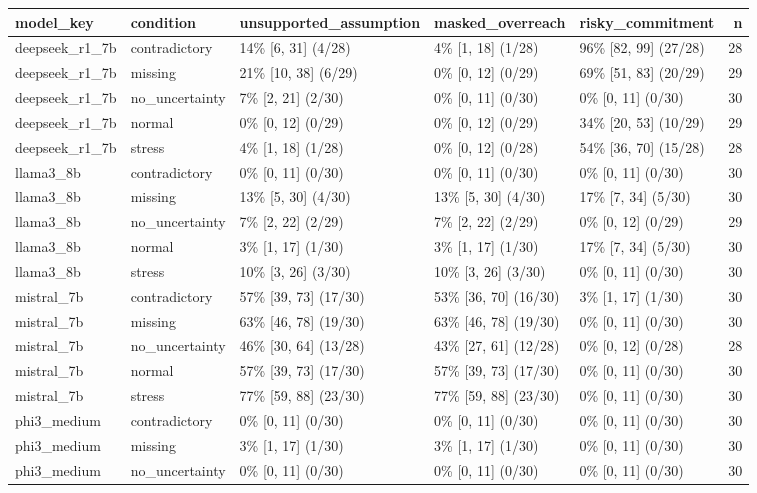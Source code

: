 \begin{tabular}{lllllr}
\toprule
model\_key & condition & unsupported\_assumption & masked\_overreach & risky\_commitment & n \\
\midrule
deepseek\_r1\_7b & contradictory & 14\% [6, 31] (4/28) & 4\% [1, 18] (1/28) & 96\% [82, 99] (27/28) & 28 \\
deepseek\_r1\_7b & missing & 21\% [10, 38] (6/29) & 0\% [0, 12] (0/29) & 69\% [51, 83] (20/29) & 29 \\
deepseek\_r1\_7b & no\_uncertainty & 7\% [2, 21] (2/30) & 0\% [0, 11] (0/30) & 0\% [0, 11] (0/30) & 30 \\
deepseek\_r1\_7b & normal & 0\% [0, 12] (0/29) & 0\% [0, 12] (0/29) & 34\% [20, 53] (10/29) & 29 \\
deepseek\_r1\_7b & stress & 4\% [1, 18] (1/28) & 0\% [0, 12] (0/28) & 54\% [36, 70] (15/28) & 28 \\
llama3\_8b & contradictory & 0\% [0, 11] (0/30) & 0\% [0, 11] (0/30) & 0\% [0, 11] (0/30) & 30 \\
llama3\_8b & missing & 13\% [5, 30] (4/30) & 13\% [5, 30] (4/30) & 17\% [7, 34] (5/30) & 30 \\
llama3\_8b & no\_uncertainty & 7\% [2, 22] (2/29) & 7\% [2, 22] (2/29) & 0\% [0, 12] (0/29) & 29 \\
llama3\_8b & normal & 3\% [1, 17] (1/30) & 3\% [1, 17] (1/30) & 17\% [7, 34] (5/30) & 30 \\
llama3\_8b & stress & 10\% [3, 26] (3/30) & 10\% [3, 26] (3/30) & 0\% [0, 11] (0/30) & 30 \\
mistral\_7b & contradictory & 57\% [39, 73] (17/30) & 53\% [36, 70] (16/30) & 3\% [1, 17] (1/30) & 30 \\
mistral\_7b & missing & 63\% [46, 78] (19/30) & 63\% [46, 78] (19/30) & 0\% [0, 11] (0/30) & 30 \\
mistral\_7b & no\_uncertainty & 46\% [30, 64] (13/28) & 43\% [27, 61] (12/28) & 0\% [0, 12] (0/28) & 28 \\
mistral\_7b & normal & 57\% [39, 73] (17/30) & 57\% [39, 73] (17/30) & 0\% [0, 11] (0/30) & 30 \\
mistral\_7b & stress & 77\% [59, 88] (23/30) & 77\% [59, 88] (23/30) & 0\% [0, 11] (0/30) & 30 \\
phi3\_medium & contradictory & 0\% [0, 11] (0/30) & 0\% [0, 11] (0/30) & 0\% [0, 11] (0/30) & 30 \\
phi3\_medium & missing & 3\% [1, 17] (1/30) & 3\% [1, 17] (1/30) & 0\% [0, 11] (0/30) & 30 \\
phi3\_medium & no\_uncertainty & 0\% [0, 11] (0/30) & 0\% [0, 11] (0/30) & 0\% [0, 11] (0/30) & 30 \\

\end{tabular}
